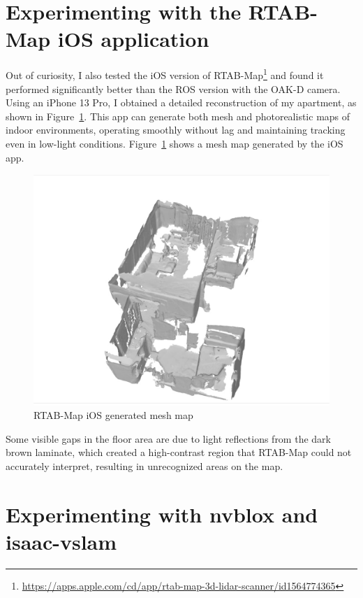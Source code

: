 \FloatBarrier
\section{Experimenting with the RTAB-Map iOS application}

Out of curiosity, I also tested the iOS version of RTAB-Map\footnote{\url{https://apps.apple.com/cd/app/rtab-map-3d-lidar-scanner/id1564774365}} and found it performed significantly better than the ROS version with the OAK-D camera. Using an iPhone 13 Pro, I obtained a detailed reconstruction of my apartment, as shown in Figure~\ref{fig:rtabmap_ios}. This app can generate both mesh and photorealistic maps of indoor environments, operating smoothly without lag and maintaining tracking even in low-light conditions. Figure~\ref{fig:rtabmap_ios} shows a mesh map generated by the iOS app.

\begin{figure}[htbp]
	\centering
	\includegraphics[width=150mm, keepaspectratio]{figures_jpg/rtabmap_ios.jpg}
	\caption{RTAB-Map iOS generated mesh map}
	\label{fig:rtabmap_ios}
\end{figure}
\FloatBarrier

Some visible gaps in the floor area are due to light reflections from the dark brown laminate, which created a high-contrast region that RTAB-Map could not accurately interpret, resulting in unrecognized areas on the map.


\section{Experimenting with nvblox and isaac-vslam} \label{experiments_nvblox}

